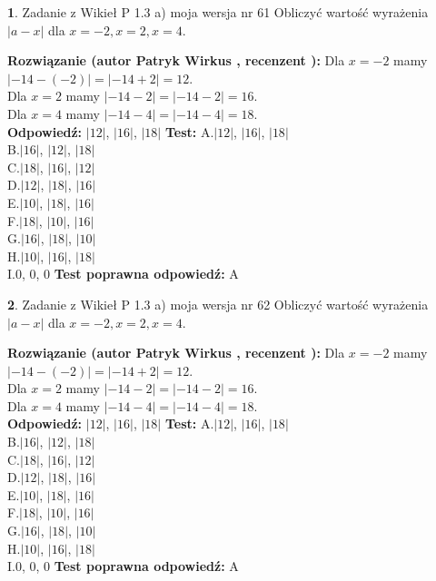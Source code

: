 \documentclass[12pt, a4paper]{article}
\theoremstyle{definition} %
\newtheorem{zad}{}
\newcommand{\zadStart}[1]{\begin{zad}#1\newline}
\newcommand{\zadStop}{\end{zad}}
\newcommand{\rozwStart}[2]{\noindent \textbf{Rozwiązanie (autor #1 , recenzent #2): }\newline}
\newcommand{\rozwStop}{\newline}
\newcommand{\odpStart}{\noindent \textbf{Odpowiedź:}\newline}
\newcommand{\odpStop}{\newline}
\newcommand{\testStart}{\noindent \textbf{Test:}\newline}
\newcommand{\testStop}{\newline}
\newcommand{\kluczStart}{\noindent \textbf{Test poprawna odpowiedź:}\newline}
\newcommand{\kluczStop}{\newline}
\begin{document}
\zadStart{Zadanie z Wikieł P 1.3 a) moja wersja nr 61}
Obliczyć wartość wyrażenia $|a - x|$ dla $x=-2,x=2,x=4$.
\zadStop
\rozwStart{Patryk Wirkus}{}
Dla $x = -2$ mamy $|-14 - (-2)| = |-14 + 2| = 12$.\\
Dla $x = 2$ mamy $|-14 - 2| = |-14 - 2| = 16$.\\
Dla $x = 4$ mamy $|-14 - 4| = |-14 - 4| = 18$.\\
\rozwStop
\odpStart
$|12|$, $|16|$, $|18|$
\odpStop
\testStart
A.$|12|$, $|16|$, $|18|$\\
B.$|16|$, $|12|$, $|18|$\\
C.$|18|$, $|16|$, $|12|$\\
D.$|12|$, $|18|$, $|16|$\\
E.$|10|$, $|18|$, $|16|$\\
F.$|18|$, $|10|$, $|16|$\\
G.$|16|$, $|18|$, $|10|$\\
H.$|10|$, $|16|$, $|18|$\\
I.$0$, $0$, $0$
\testStop
\kluczStart
A
\kluczStop



\zadStart{Zadanie z Wikieł P 1.3 a) moja wersja nr 62}
Obliczyć wartość wyrażenia $|a - x|$ dla $x=-2,x=2,x=4$.
\zadStop
\rozwStart{Patryk Wirkus}{}
Dla $x = -2$ mamy $|-14 - (-2)| = |-14 + 2| = 12$.\\
Dla $x = 2$ mamy $|-14 - 2| = |-14 - 2| = 16$.\\
Dla $x = 4$ mamy $|-14 - 4| = |-14 - 4| = 18$.\\
\rozwStop
\odpStart
$|12|$, $|16|$, $|18|$
\odpStop
\testStart
A.$|12|$, $|16|$, $|18|$\\
B.$|16|$, $|12|$, $|18|$\\
C.$|18|$, $|16|$, $|12|$\\
D.$|12|$, $|18|$, $|16|$\\
E.$|10|$, $|18|$, $|16|$\\
F.$|18|$, $|10|$, $|16|$\\
G.$|16|$, $|18|$, $|10|$\\
H.$|10|$, $|16|$, $|18|$\\
I.$0$, $0$, $0$
\testStop
\kluczStart
A
\kluczStop
\end{document}
